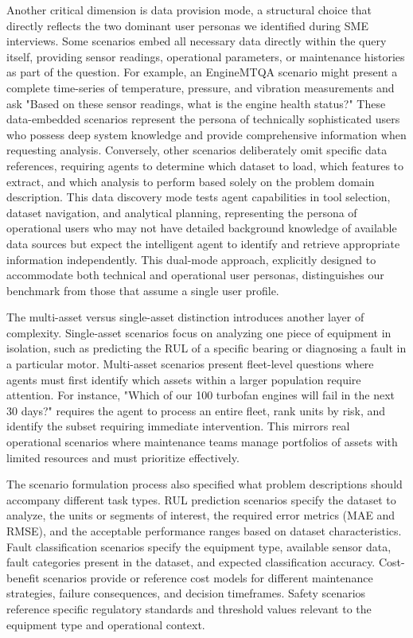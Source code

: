 \documentclass[conference]{IEEEtran}
\begin{document}
Another critical dimension is data provision mode, a structural choice that directly reflects the two dominant user personas we identified during SME interviews. Some scenarios embed all necessary data directly within the query itself, providing sensor readings, operational parameters, or maintenance histories as part of the question. For example, an EngineMTQA scenario might present a complete time-series of temperature, pressure, and vibration measurements and ask "Based on these sensor readings, what is the engine health status?" These data-embedded scenarios represent the persona of technically sophisticated users who possess deep system knowledge and provide comprehensive information when requesting analysis. Conversely, other scenarios deliberately omit specific data references, requiring agents to determine which dataset to load, which features to extract, and which analysis to perform based solely on the problem domain description. This data discovery mode tests agent capabilities in tool selection, dataset navigation, and analytical planning, representing the persona of operational users who may not have detailed background knowledge of available data sources but expect the intelligent agent to identify and retrieve appropriate information independently. This dual-mode approach, explicitly designed to accommodate both technical and operational user personas, distinguishes our benchmark from those that assume a single user profile.

The multi-asset versus single-asset distinction introduces another layer of complexity. Single-asset scenarios focus on analyzing one piece of equipment in isolation, such as predicting the RUL of a specific bearing or diagnosing a fault in a particular motor. Multi-asset scenarios present fleet-level questions where agents must first identify which assets within a larger population require attention. For instance, "Which of our 100 turbofan engines will fail in the next 30 days?" requires the agent to process an entire fleet, rank units by risk, and identify the subset requiring immediate intervention. This mirrors real operational scenarios where maintenance teams manage portfolios of assets with limited resources and must prioritize effectively.

The scenario formulation process also specified what problem descriptions should accompany different task types. RUL prediction scenarios specify the dataset to analyze, the units or segments of interest, the required error metrics (MAE and RMSE), and the acceptable performance ranges based on dataset characteristics. Fault classification scenarios specify the equipment type, available sensor data, fault categories present in the dataset, and expected classification accuracy. Cost-benefit scenarios provide or reference cost models for different maintenance strategies, failure consequences, and decision timeframes. Safety scenarios reference specific regulatory standards and threshold values relevant to the equipment type and operational context.
\end{document}

